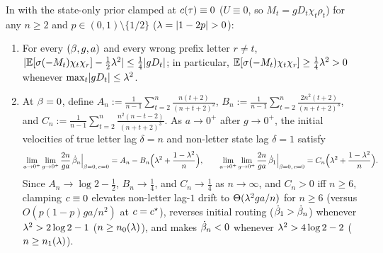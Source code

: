 \begin{lemma}
\label{lem:clamped-shortcut}
In \stepode{} with the state-only prior clamped at $c(\tau) \equiv 0$ ($U \equiv 0$, so $M_t = g D_t\chi_t\rho_t$) for any $n \ge 2$ and $p \in (0,1) \setminus \{1/2\}$ ($\lambda = \lvert 1-2p\rvert > 0$):
\begin{enumerate}[label=(\alph*),leftmargin=*]
\item For every $(\beta, g, a)$ and every wrong prefix letter $r \ne t$, $\lvert\mathbb E[\sigma(-M_t)\chi_t\chi_r] - \frac{1}{2}\lambda^2\rvert \le \frac{1}{4}\lvert g D_t\rvert$; in particular, $\mathbb E[\sigma(-M_t)\chi_t\chi_r] \ge \frac{1}{4}\lambda^2 > 0$ whenever $\max_t\lvert g D_t\rvert \le \lambda^2$.
\item At $\beta = 0$, define $A_n := \frac{1}{n-1}\sum_{t=2}^n \frac{n(t+2)}{(n+t+2)^2}$, $B_n := \frac{1}{n-1}\sum_{t=2}^n \frac{2n^2(t+2)}{(n+t+2)^3}$, and $C_n := \frac{1}{n-1}\sum_{t=2}^n \frac{n^2(n-t-2)}{(n+t+2)^3}$. As $a \to 0^+$ after $g \to 0^+$, the initial velocities of true letter lag $\delta = n$ and non-letter state lag $\delta = 1$ satisfy
\[
  \lim_{a\to 0^+}\lim_{g\to 0^+}\frac{2n}{ga}\,\dot{\beta}_n\Big|_{\beta=0,\,c=0} = A_n - B_n\Bigl(\lambda^2 + \frac{1-\lambda^2}{n}\Bigr), \qquad
  \lim_{a\to 0^+}\lim_{g\to 0^+}\frac{2n}{ga}\,\dot{\beta}_1\Big|_{\beta=0,\,c=0} = C_n\Bigl(\lambda^2 + \frac{1-\lambda^2}{n}\Bigr).
\]
Since $A_n \to \log 2 - \frac{1}{2}$, $B_n \to \frac{1}{4}$, and $C_n \to \frac{1}{4}$ as $n \to \infty$, and $C_n > 0$ iff $n \ge 6$, clamping $c \equiv 0$ elevates non-letter lag-$1$ drift to $\Theta(\lambda^2 ga/n)$ for $n \ge 6$ (versus $O(p(1-p)ga/n^2)$ at $c = c^\star$), reverses initial routing ($\dot{\beta}_1 > \dot{\beta}_n$) whenever $\lambda^2 > 2\log 2 - 1$ ($n \ge n_0(\lambda)$), and makes $\dot{\beta}_n < 0$ whenever $\lambda^2 > 4\log 2 - 2$ ($n \ge n_1(\lambda)$).
\end{enumerate}
\end{lemma}
